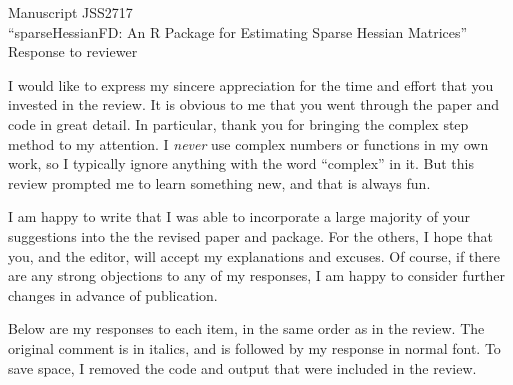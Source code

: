 \documentclass{article}
\begin{document}
{\bfseries
\begin{center}
  Manuscript JSS2717\\
 ``sparseHessianFD: An R Package for Estimating Sparse
 Hessian Matrices''\\
 \vspace{\baselineskip}
 Response to reviewer
\end{center}
}
\vspace{\baselineskip}

I would like to express my sincere appreciation for the time and effort that
you invested in the review.  It is obvious to me that you went through
the paper and code in great detail.  In
particular, thank you for bringing the complex step
method to my attention.  I \emph{never} use complex numbers or
functions in my own work, so I typically ignore anything with the word
``complex'' in it.  But this review prompted me to learn something
new, and that is always fun.

I am happy to write that I was able to incorporate a large majority of
your suggestions into the the revised paper and package. For the
others, I hope that you, and the editor, will accept my
explanations and excuses.  Of course, if there are any strong
objections to any of my responses, I am happy
to consider further changes in advance of publication.

Below are my responses to each item, in the same order as in the
review.  The original comment is in italics, and is followed by my
response in normal font.  To save space, I removed the code and output
that were included in the review.

\vspace{\baselineskip}
\end{document}
